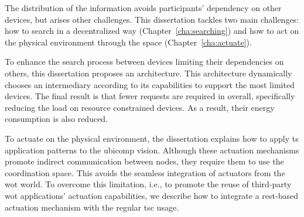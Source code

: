 The distribution of the information avoids participants' dependency on other devices, but arises other challenges.
This dissertation tackles two main challenges: how to search in a decentralized way (Chapter~\ref{cha:searching}) and how to act on the physical environment through the space (Chapter~\ref{cha:actuate}).


To enhance the search process between devices limiting their dependencies on others, this dissertation proposes an architecture.
This architecture dynamically chooses an intermediary according to its capabilities to support the most limited devices.
The final result is that fewer requests are required in overall, specifically reducing the load on resource constrained devices.
As a result, their energy consumption is also reduced.


To actuate on the physical environment, the dissertation explains how to apply \ac{ts} application patterns to the \ac{ubicomp} vision.
Although these actuation mechanisms promote indirect communication between nodes, they require them to use the coordination space.
This avoids the seamless integration of actuators from the \ac{wot} world. %
To overcome this limitation, i.e., to promote the reuse of third-party \ac{wot} applications' actuation capabilities, we describe how to integrate a \ac{rest}-based actuation mechanism with the regular \ac{tsc} usage.








